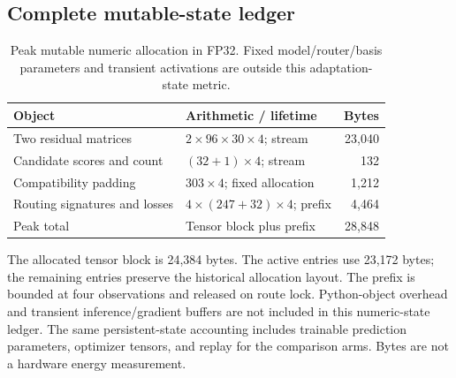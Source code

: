 \subsection{Complete mutable-state ledger}
\begin{table}[tbp]\centering\small
\caption{Peak mutable numeric allocation in FP32. Fixed model/router/basis
parameters and transient activations are outside this adaptation-state metric.}
\label{tab:ledger}
\begin{tabular}{@{}llr@{}}\toprule
Object & Arithmetic / lifetime & Bytes\\\midrule
Two residual matrices & $2\times96\times30\times4$; stream & 23,040\\
Candidate scores and count & $(32+1)\times4$; stream & 132\\
Compatibility padding & $303\times4$; fixed allocation & 1,212\\
Routing signatures and losses & $4\times(247+32)\times4$; prefix & 4,464\\\midrule
Peak total & Tensor block plus prefix & 28,848\\\bottomrule
\end{tabular}\end{table}
The allocated tensor block is 24,384 bytes. The active entries use 23,172
bytes; the remaining entries preserve the historical allocation layout.
The prefix is bounded at four observations and released on route lock.
Python-object overhead and transient inference/gradient buffers are not
included in this numeric-state ledger. The same persistent-state accounting
includes trainable prediction parameters, optimizer tensors, and replay for
the comparison arms. Bytes are not a hardware energy measurement.
